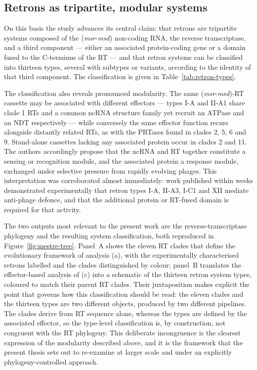  


\subsection{Retrons as tripartite, modular systems}
 
On this basis the study advances its central claim: that retrons are tripartite systems composed
of the (\textit{msr}-\textit{msd}) non-coding RNA, the reverse transcriptase, and a third
component --- either an associated protein-coding gene or a domain fused to the C-terminus of the
RT --- and that retron systems can be classified into thirteen types, several with subtypes or
variants, according to the identity of that third component. The classification is given in
Table~\ref{tab:retron-types}.
 
The classification also reveals pronounced modularity. The same (\textit{msr}-\textit{msd})-RT
cassette may be associated with different effectors --- types I-A and II-A1 share clade 1 RTs and
a common ncRNA structure family yet recruit an ATPase and an NDT respectively --- while conversely
the same effector function recurs alongside distantly related RTs, as with the PRTases found in
clades 2, 5, 6 and 9. Stand-alone cassettes lacking any associated protein occur in clades 2 and
11. The authors accordingly propose that the ncRNA and RT together constitute a sensing or
recognition module, and the associated protein a response module, exchanged under selective
pressure from rapidly evolving phages. This interpretation was corroborated almost immediately:
work published within weeks \cite{gao2020, millman2020} demonstrated experimentally that retron
types I-A, II-A3, I-C1 and XII mediate anti-phage defence, and that the additional protein or
RT-fused domain is required for that activity.
 
The two outputs most relevant to the present work are the reverse-transcriptase phylogeny and the
resulting system classification, both reproduced in Figure~\ref{fig:mestre-tree}. Panel~A shows
the eleven RT clades that define the evolutionary framework of analysis (a), with the
experimentally characterised retrons labelled and the clades distinguished by colour; panel~B
translates the effector-based analysis of (c) into a schematic of the thirteen retron system
types, coloured to match their parent RT clades. Their juxtaposition makes explicit the point that
governs how this classification should be read: the eleven clades and the thirteen types are two
different objects, produced by two different pipelines. The clades derive from RT sequence alone,
whereas the types are defined by the associated effector, so the type-level classification is, by
construction, not congruent with the RT phylogeny. This deliberate incongruence is the clearest
expression of the modularity described above, and it is the framework that the present thesis sets
out to re-examine at larger scale and under an explicitly phylogeny-controlled approach.
 

